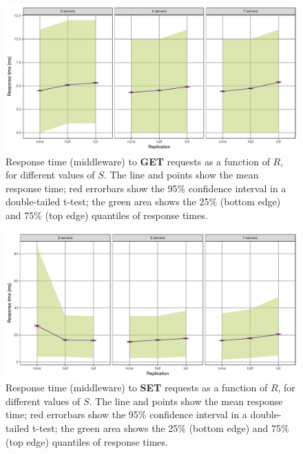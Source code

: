 \documentclass[11pt]{article}
\begin{document}
\begin{figure}[h]
\centering
\includegraphics[width=\textwidth]{../results/replication/graphs/response_time_vs_replication_get.pdf}
\caption{Response time (middleware) to \textbf{GET} requests as a function of $R$, for different values of $S$. The line and points show the mean response time; red errorbars show the 95\% confidence interval in a double-tailed t-test; the green area shows the 25\% (bottom edge) and 75\% (top edge) quantiles of response times.}
\label{fig:exp2:res:replication:get}
\end{figure}

\begin{figure}[h]
\centering
\includegraphics[width=\textwidth]{../results/replication/graphs/response_time_vs_replication_set.pdf}
\caption{Response time (middleware) to \textbf{SET} requests as a function of $R$, for different values of $S$. The line and points show the mean response time; red errorbars show the 95\% confidence interval in a double-tailed t-test; the green area shows the 25\% (bottom edge) and 75\% (top edge) quantiles of response times.}
\label{fig:exp2:res:replication:set}
\end{figure}
\end{document}

